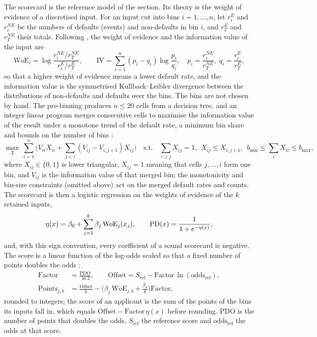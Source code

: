 The scorecard is the reference model of the section. Its theory is the weight of evidence of a discretised input. For an input
cut into bins $i=1,\dots,n$, let $r_i^{E}$ and $r_i^{NE}$ be the numbers of defaults (events) and non-defaults in bin $i$, and
$r_T^{E}$ and $r_T^{NE}$ their totals. Following \citet{credit-scoring:navas2020}, the weight of evidence and the information
value of the input are
\begin{equation}
\mathrm{WoE}_i=\log\frac{r_i^{NE}/r_T^{NE}}{r_i^{E}/r_T^{E}},\qquad
\mathrm{IV}=\sum_{i=1}^{n}(p_i-q_i)\log\frac{p_i}{q_i},\quad p_i=\frac{r_i^{NE}}{r_T^{NE}},\; q_i=\frac{r_i^{E}}{r_T^{E}},
\label{eq:cs-woe}
\end{equation}
so that a higher weight of evidence means a lower default rate, and the information value is the symmetrised Kullback--Leibler
divergence between the distributions of non-defaults and defaults over the bins. The bins are not chosen by hand. The pre-binning
produces $n\le 20$ cells from a decision tree, and an integer linear program merges consecutive cells to maximise the information
value of the result under a monotone trend of the default rate, a minimum bin share and bounds on the number of bins
\citep{credit-scoring:navas2020}:
\begin{equation}
\max_{X}\ \sum_{i=1}^{n}\Big(V_{ii}X_{ii}+\sum_{j<i}(V_{ij}-V_{i,j+1})X_{ij}\Big)
\quad\text{s.t.}\quad \sum_{i\ge j}X_{ij}=1,\ \ X_{ij}\le X_{i,j+1},\ \ b_{\min}\le\sum_i X_{ii}\le b_{\max},
\label{eq:cs-binning}
\end{equation}
where $X_{ij}\in\{0,1\}$ is lower triangular, $X_{ij}=1$ meaning that cells $j,\dots,i$ form one bin, and $V_{ij}$ is the
information value of that merged bin; the monotonicity and bin-size constraints (omitted above) act on the merged default rates
and counts. The scorecard is then a logistic regression on the weights of evidence of the $k$ retained inputs,
\begin{equation}
\eta(x)=\beta_0+\sum_{j=1}^{k}\beta_j\,\mathrm{WoE}_j(x_j),\qquad \mathrm{PD}(x)=\frac{1}{1+e^{-\eta(x)}},
\label{eq:cs-logit}
\end{equation}
and, with this sign convention, every coefficient of a sound scorecard is negative. The score is a linear function of the log-odds
scaled so that a fixed number of points doubles the odds \citep{credit-scoring:siddiqi2017,credit-scoring:skorecard}:
\begin{equation}
\begin{aligned}
\text{Factor}&=\frac{\text{PDO}}{\ln 2},\qquad
\text{Offset}=S_{\mathrm{ref}}-\text{Factor}\,\ln(\text{odds}_{\mathrm{ref}}),\\
\text{Points}_{j,b}&=\frac{\text{Offset}}{k}-\Big(\beta_j\,\mathrm{WoE}_{j,b}+\frac{\beta_0}{k}\Big)\text{Factor},
\end{aligned}
\label{eq:cs-points}
\end{equation}
rounded to integers; the score of an applicant is the sum of the points of the bins its inputs fall in, which equals
$\text{Offset}-\text{Factor}\,\eta(x)$ before rounding. PDO is the number of points that doubles the odds, $S_{\mathrm{ref}}$ the
reference score and $\text{odds}_{\mathrm{ref}}$ the odds at that score.

